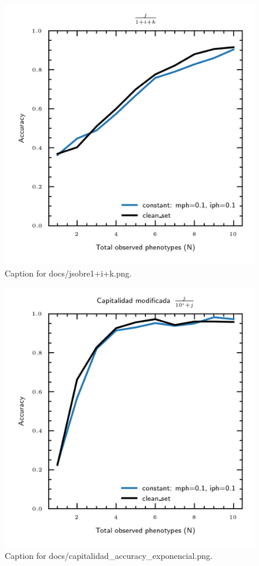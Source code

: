 \documentclass{article}
\begin{document}
\begin{figure}[h] \centering \includegraphics{docs/jsobre1+i+k.png} \caption{Caption for docs/jsobre1+i+k.png.} \end{figure}
\begin{figure}[h] \centering \includegraphics{docs/capitalidad_accuracy_exponencial.png} \caption{Caption for docs/capitalidad_accuracy_exponencial.png.} \end{figure}
\end{document}
